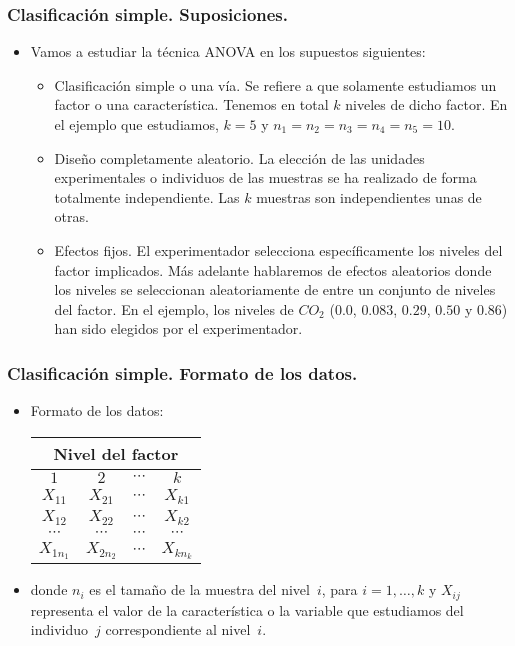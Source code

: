 \begin{frame}
\frametitle{Clasificación simple. Suposiciones.}
\begin{itemize}
\item<2-> Vamos a estudiar la técnica ANOVA en los supuestos siguientes:
\begin{itemize}
\item<3-> Clasificación simple o una vía. Se refiere a que solamente estudiamos un factor o una característica. Tenemos en total $k$ niveles de dicho factor. En el ejemplo que estudiamos, $k=5$ y $n_1 =n_2 =n_3=n_4=n_5 =10$.
\item<4-> Diseño completamente aleatorio. La elección de las unidades experimentales o individuos de las muestras se ha realizado de forma totalmente independiente. Las $k$ muestras son independientes unas de otras.
\item<5-> Efectos fijos. El experimentador selecciona específicamente los niveles del factor implicados. Más adelante hablaremos de efectos aleatorios donde los niveles se seleccionan aleatoriamente de entre un conjunto de niveles del factor. En el ejemplo, los niveles de $CO_2$ ($0.0$, $0.083$, $0.29$, $0.50$ y $0.86$) han sido elegidos por el experimentador. 
\end{itemize}
\end{itemize}
\end{frame}
\begin{frame}
\frametitle{Clasificación simple. Formato de los datos.}
\begin{itemize}
\item<2-> Formato de los datos:
\begin{center}
\begin{tabular}{cccc}
\multicolumn{4}{c}{Nivel del factor}\\\hline
$1$&$2$&$\cdots$&$k$\\\hline
$X_{11}$&$X_{21}$&$\cdots$&$X_{k1}$\\
$X_{12}$&$X_{22}$&$\cdots$&$X_{k2}$\\
$\cdots$&$\cdots$&$\cdots$&$\cdots$\\
$X_{1n_1}$&$X_{2n_2}$&$\cdots$&$X_{kn_k}$\\\hline
\end{tabular}
\end{center}
\item<3-> donde $n_i$ es el tamaño de la muestra del nivel~$i$, para $i=1,\ldots,k$ y $X_{ij}$ representa el valor de la característica o la variable que estudiamos del individuo~$j$ correspondiente al nivel~$i$.
\end{itemize}

\end{frame}

